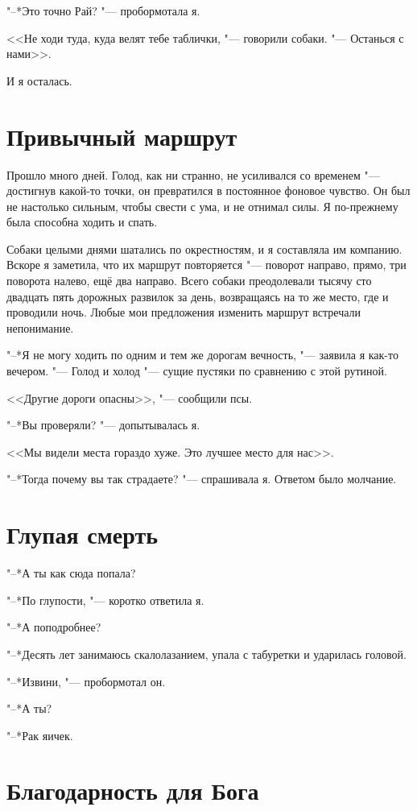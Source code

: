"--*Это точно Рай? "--- пробормотала я.

<<Не ходи туда, куда велят тебе таблички, "--- говорили собаки.
"--- Останься с нами>>.

И я осталась.

\section{Привычный маршрут}

Прошло много дней.
Голод, как ни странно, не усиливался со временем "--- достигнув какой-то точки, он превратился в постоянное фоновое чувство.
Он был не настолько сильным, чтобы свести с ума, и не отнимал силы.
Я по-прежнему была способна ходить и спать.

Собаки целыми днями шатались по окрестностям, и я составляла им компанию.
Вскоре я заметила, что их маршрут повторяется "--- поворот направо, прямо, три поворота налево, ещё два направо.
Всего собаки преодолевали тысячу сто двадцать пять дорожных развилок за день, возвращаясь на то же место, где и проводили ночь.
Любые мои предложения изменить маршрут встречали непонимание.

"--*Я не могу ходить по одним и тем же дорогам вечность, "--- заявила я как-то вечером.
"--- Голод и холод "--- сущие пустяки по сравнению с этой рутиной.

<<Другие дороги опасны>>, "--- сообщили псы.

"--*Вы проверяли? "--- допытывалась я.

<<Мы видели места гораздо хуже.
Это лучшее место для нас>>.

"--*Тогда почему вы так страдаете? "--- спрашивала я.
Ответом было молчание.

\section{Глупая смерть}

"--*А ты как сюда попала?

"--*По глупости, "--- коротко ответила я.

"--*А поподробнее?

"--*Десять лет занимаюсь скалолазанием, упала с табуретки и ударилась головой.

"--*Извини, "--- пробормотал он.

"--*А ты?

"--*Рак яичек.

\section{Благодарность для Бога}

